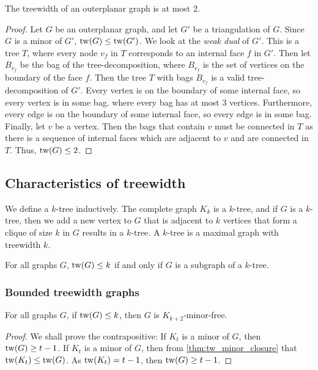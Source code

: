 \begin{lemma}\label{ex:tw_outerplanar}
	The treewidth of an outerplanar graph is at most 2.
\end{lemma}
\begin{proof}
	Let \(G\) be an outerplanar graph, and let \(G'\) be a triangulation of \(G\). Since \(G\) is a minor of \(G'\), \(\operatorname{tw}(G) \leq \operatorname{tw}(G')\). We look at the \textit{weak dual} of \(G'\). This is a tree \(T\), where every node \(v_f\) in \(T\) corresponds to an internal face \(f\) in \(G'\). Then let \(B_{v_f}\) be the bag of the tree-decomposition, where \(B_{v_f}\) is the set of vertices on the boundary of the face \(f\). Then the tree \(T\) with bags \(B_{v_f}\) is a valid tree-decomposition of \(G'\). Every vertex is on the boundary of some internal face, so every vertex is in some bag.  where every bag has at most 3 vertices. Furthermore, every edge is on the boundary of some internal face, so every edge is in some bag. Finally, let $v$ be a vertex. Then the bags that contain $v$ must be connected in $T$ as there is a sequence of internal faces which are adjacent to $v$ and are connected in $T$. Thus, \(\operatorname{tw}(G) \leq 2\).
\end{proof}

\subsection{Characteristics of treewidth}\label{ssec:characterising_Treewidth}
We define a \(k\)-tree inductively. The complete graph \(K_k\) is a \(k\)-tree, and if \(G\) is a \(k\)-tree, then we add a new vertex to \(G\) that is adjacent to \(k\) vertices that form a clique of size \(k\) in \(G\) results in a \(k\)-tree.
A \(k\)-tree is a maximal graph with treewidth \(k\).
\begin{theorem}
	For all graphs $G$, \(\operatorname{tw}(G) \leq k\) if and only if \(G\) is a subgraph of a \(k\)-tree.
\end{theorem}


\subsubsection{Bounded treewidth graphs}\label{sssec:Graph_treewidth_Bounded}
\begin{theorem}\label{thm:treewidth_clique-minor-free}
	For all graphs $G$, if \(\operatorname{tw}(G) \leq k\), then \(G\) is \(K_{k+2}\)-minor-free.
\end{theorem}
\begin{proof}
	We shall prove the contrapositive: If \(K_t\) is a minor of \(G\), then \(\operatorname{tw}(G) \geq t-1\).
	If \(K_t\) is a minor of \(G\), then from \cref{thm:tw_minor_closure} that \(\operatorname{tw}(K_t) \leq \operatorname{tw}(G)\). As \(\operatorname{tw}(K_t) = t-1\), then \(\operatorname{tw}(G) \geq t - 1\).
\end{proof}

